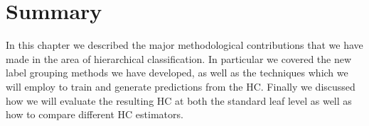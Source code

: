 \documentclass[../thesis.tex]{subfiles}
\begin{document}
\section{Summary}
In this chapter we described the major methodological contributions that we have
made in the area of hierarchical classification. In particular we covered the
new label grouping methods we have developed, as well as the techniques which we
will employ to train and generate predictions from the HC. Finally we discussed
how we will evaluate the resulting HC at both the standard leaf level as well as
how to compare different HC estimators.
\end{document}
